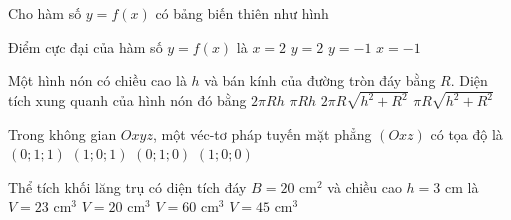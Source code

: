 \begin{ex}%
Cho hàm số $y=f(x)$ có bảng biến thiên như hình 
\begin{center}
\end{center}
Điểm cực đại của hàm số $y=f(x)$ là
\choice
{$x=2$}
{$y=2$}
{$y=-1$}
{\True $x=-1$}
\end{ex}

\begin{ex}%
Một hình nón có chiều cao là $h$ và bán kính của đường tròn đáy bằng $R$. Diện tích xung quanh của hình nón đó bằng
\choice
{$2 \pi R h$}
{$\pi R h$}
{$2 \pi R \sqrt{h^2+R^2}$}
{\True $\pi R \sqrt{h^2+R^2}$}
\end{ex}

\begin{ex}%
Trong không gian $Oxyz$, một véc-tơ pháp tuyến mặt phẳng $(Oxz)$ có tọa độ là
\choice
{$(0; 1; 1)$}
{$(1; 0; 1)$}
{\True $(0; 1; 0)$}
{$(1; 0; 0)$}
\end{ex}

\begin{ex}%
Thể tích khối lăng trụ có diện tích đáy $B=20 \text{~cm}^2$ và chiều cao $h=3 \text{~cm}$ là
\choice
{$V=23 \text{~cm}^3$}
{$V=20 \text{~cm}^3$}
{\True $V=60 \text{~cm}^3$}
{$V=45 \text{~cm}^3$}
\end{ex}

